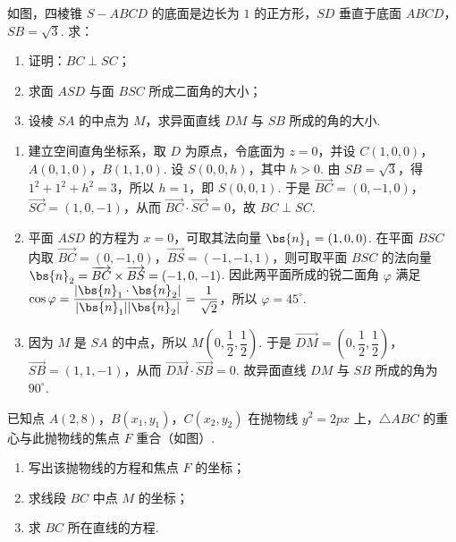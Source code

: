 \begin{problem}
如图，四棱锥 \(S-ABCD\) 的底面是边长为 \(1\) 的正方形，\(SD\) 垂直于底面 \(ABCD\)，\(SB=\sqrt{3}\). 求：

\begin{enumerate}
\item 证明：\(BC\perp SC\)；
\item 求面 \(ASD\) 与面 \(BSC\) 所成二面角的大小；
\item 设棱 \(SA\) 的中点为 \(M\)，求异面直线 \(DM\) 与 \(SB\) 所成的角的大小.
\end{enumerate}

\end{problem}

\begin{solution}
\begin{enumerate}
\item 建立空间直角坐标系，取 \(D\) 为原点，令底面为 \(z=0\)，并设 \(C(1,0,0)\)，\(A(0,1,0)\)，\(B(1,1,0)\). 设 \(S(0,0,h)\)，其中 \(h>0\). 由 \(SB=\sqrt3\)，得 \(1^2+1^2+h^2=3\)，所以 \(h=1\)，即 \(S(0,0,1)\). 于是 \(\overrightarrow{BC}=(0,-1,0)\)，\(\overrightarrow{SC}=(1,0,-1)\)，从而 \(\overrightarrow{BC}\cdot\overrightarrow{SC}=0\)，故 \(BC\perp SC\).
\item 平面 \(ASD\) 的方程为 \(x=0\)，可取其法向量 \(\bs{n}_1=(1,0,0)\). 在平面 \(BSC\) 内取 \(\overrightarrow{BC}=(0,-1,0)\)，\(\overrightarrow{BS}=(-1,-1,1)\)，则可取平面 \(BSC\) 的法向量 \(\bs{n}_2=\overrightarrow{BC}\times\overrightarrow{BS}=(-1,0,-1)\). 因此两平面所成的锐二面角 \(\varphi\) 满足 \(\cos\varphi=\dfrac{|\bs{n}_1\cdot\bs{n}_2|}{|\bs{n}_1||\bs{n}_2|}=\dfrac1{\sqrt2}\)，所以 \(\varphi=45^{\circ}\).
\item 因为 \(M\) 是 \(SA\) 的中点，所以 \(M\left(0,\dfrac12,\dfrac12\right)\). 于是 \(\overrightarrow{DM}=\left(0,\dfrac12,\dfrac12\right)\)，\(\overrightarrow{SB}=(1,1,-1)\)，从而 \(\overrightarrow{DM}\cdot\overrightarrow{SB}=0\). 故异面直线 \(DM\) 与 \(SB\) 所成的角为 \(90^{\circ}\).
\end{enumerate}
\end{solution}

\begin{problem}
已知点 \(A(2,8)\)，\(B(x_1,y_1)\)，\(C(x_2,y_2)\) 在抛物线 \(y^2=2px\) 上，\(\triangle ABC\) 的重心与此抛物线的焦点 \(F\) 重合（如图）.

\begin{enumerate}
\item 写出该抛物线的方程和焦点 \(F\) 的坐标；
\item 求线段 \(BC\) 中点 \(M\) 的坐标；
\item 求 \(BC\) 所在直线的方程.
\end{enumerate}

\end{problem}

